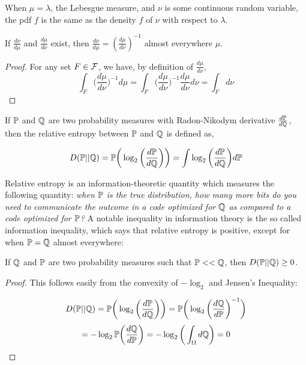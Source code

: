 \begin{example}
    When $\mu = \lambda$, the Lebesgue measure, and $\nu$ is some continuous random variable, 
    the pdf $f$ is the same as the density $f$ of $\nu$ with respect to $\lambda$. 
\end{example}

\begin{lemma} 
    If $\frac{d\nu}{d\mu}$ and $\frac{d\mu}{d\nu}$ exist, then 
    $\frac{d\nu}{d\mu} = (\frac{d\mu}{d\nu})^{-1}$ almost everywhere 
    $\mu$.
\end{lemma}
\begin{proof} 
    For any set $F \in \mathcal F$, we have, by definition of $\frac{d\mu}{d\nu}$, 
    \[ \int_F \bigg(\frac{d\mu}{d\nu}\bigg)^{-1} d\mu = \int_F \bigg(\frac{d\mu}{d\nu}\bigg)^{-1} \frac{d\mu}{d\nu}d\nu = \int_F d\nu  \] 

\end{proof}

\begin{example}
    If $\mathbb P$ and $\mathbb Q$ are two probability measures with Radon-Nikodym derivative $\frac{d\mathbb P}{d\mathbb Q}$, then 
    the relative entropy between $\mathbb P$ and $\mathbb Q$ is defined as, 

    \[ D(\mathbb P || \mathbb Q) = \mathbb P\bigg(\log_2\bigg(\frac{d\mathbb P}{d\mathbb Q}\bigg)\bigg)  = \int \log_2\bigg(\frac{d\mathbb P}{d\mathbb Q}\bigg)d\mathbb P \]
\end{example}

Relative entropy is an information-theoretic quantity which measures the following quantity: 
\emph{when $\mathbb P$ is the true distribution, how many more bits do you need to communicate the outcome 
in a code optimized for $\mathbb Q$ as compared to a code optimized for $\mathbb P$?} A notable inequality in 
information theory is the so called information inequality, which says that relative entropy is positive, 
except for when $\mathbb P = \mathbb Q$ almost everywhere: 

\begin{theorem}
    If $\mathbb Q$ and $\mathbb P$ are two probability measures such that $\mathbb P << \mathbb Q$, then $D(\mathbb P||\mathbb Q) \geq 0$.
\end{theorem}
\begin{proof} 
    This follows easily from the convexity of $-\log_2$ and Jensen's Inequality:

    \[ D(\mathbb P || \mathbb Q) = \mathbb P\bigg(\log_2\bigg(\frac{d\mathbb P}{d\mathbb Q}\bigg)\bigg) = \mathbb P\bigg(\log_2\bigg(\frac{d\mathbb Q}{d\mathbb P}\bigg)^{-1}\bigg)\]
    \[ = - \log_2\mathbb P\bigg(\frac{d\mathbb Q}{d\mathbb P}\bigg) = -\log_2\bigg(\int_\Omega d\mathbb Q \bigg) = 0 \]
\end{proof}

